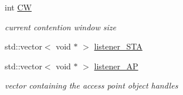 \begin{DoxyCompactItemize}
int \hyperlink{classSTA_add0683c8927abd74b422d88844a00602}{C\-W}
\begin{DoxyCompactList}\small\item\em current contention window size \end{DoxyCompactList}\item 
std\-::vector$<$ void $\ast$ $>$ \hyperlink{classSTA_aee34ffb68253dca6db2b1f52206a5f3e}{listener\-\_\-\-S\-T\-A}
\item 
std\-::vector$<$ void $\ast$ $>$ \hyperlink{classSTA_ad1ed3b95cc0693485be77e8910253ea1}{listener\-\_\-\-A\-P}
\begin{DoxyCompactList}\small\item\em vector containing the access point object handles \end{DoxyCompactList}\end{DoxyCompactItemize}
